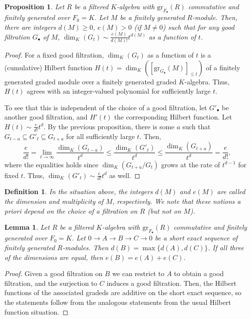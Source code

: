 \documentclass[11pt]{book}
\newtheorem{lemma}[theorem]{Lemma}
\newtheorem{proposition}[theorem]{Proposition}
\newtheorem{definition}[theorem]{Definition}
\numberwithin{equation}{section}
\numberwithin{theorem}{chapter}
\theoremstyle{definition}
\newtheorem*{basic properties}{Basic Properties}
\newtheorem*{Important Remark}{Important Remark}
\theoremstyle{remark}
\renewcommand{\dim}{\operatorname{dim}}
\begin{document}
\begin{proposition} Let $R$ be a filtered $K$-algebra with $\mathrm{gr}_{F_\bullet}(R)$ commutative and finitely generated over $F_0=K$. Let $M$ be a finitely generated $R$-module. Then, there are integers $d(M)\geq 0$, $e(M)>0$ (if $M\neq 0$) such that for any good filtration $G_\bullet$ of $M$, $\dim_K(G_t)\sim \frac{e(M)}{d(M)!} t^{d(M)}$ as a function of $t$. 
	\end{proposition}
\begin{proof}
	For a fixed good filtration, $\dim_K(G_t)$ as a function of $t$ is a (cumulative) Hilbert function $H(t)=\dim_K([\mathrm{gr}_{G_\bullet}(M)]_{\leq t})$
	of a finitely generated graded module over a finitely generated graded $K$-algebra. Thus, $H(t)$ agrees with an integer-valued polynomial for sufficiently large $t$.
	
	To see that this is independent of the choice of a good filtration, let $G'_{\bullet}$ be another good filtration, and $H'(t)$ the corresponding Hilbert function. Let $H(t)\sim \frac{e}{d!} t^d$. By the previous proposition, there is some $a$ such that $G_{t-a} \subseteq G'_{t} \subseteq G_{t+a}$ for all sufficiently large $t$. Then,
	\[ \frac{e}{d!} = \lim_{t\to \infty} \frac{\dim_K (G_{t-a})}{t^d} \leq \frac{\dim_K (G'_{t})}{t^d} \leq \frac{\dim_K (G_{t+a})}{t^d} = \frac{e}{d!}, \]
	where the equalities holds since $\dim_K(G_{t+a}/G_{t})$ grows at the rate of $t^{d-1}$ for fixed $t$. Thus, $\dim_K(G'_t)\sim \frac{e}{d!} t^d$ as well.
\end{proof}

\begin{definition} In the situation above, the integers $d(M)$ and $e(M)$ are called the \emph{dimension} and \emph{multiplicity} of $M$, respectively. We note that these notions a priori depend on the choice of a filtration on $R$ (but not on $M$).
	\end{definition}


\begin{lemma} Let $R$ be a filtered $K$-algebra with $\mathrm{gr}_{F_\bullet}(R)$ commutative and finitely generated over $F_0=K$. Let $0 \to A \to B \to C \to 0$ be a short exact sequence of finitely generated $R$-modules. Then $d(B)=\max\{d(A),d(C)\}$. If all three of the dimensions are equal, then $e(B)=e(A)+e(C)$.
\end{lemma}
\begin{proof}
	Given a good filtration on $B$ we can restrict to $A$ to obtain a good filtration, and the surjection to $C$ induces a good filtration. Then, the Hilbert functions of the associated gradeds are additive on the short exact sequence, so the statements follow from the analogous statements from the usual Hilbert function situation.
\end{proof}
\end{document}

